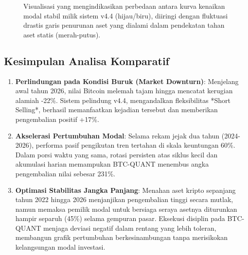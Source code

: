 \documentclass[a4paper,11pt]{article}
\begin{document}
\begin{figure}[h!]
\centering
{}
\caption{Visualisasi yang mengindikasikan perbedaan antara kurva kenaikan modal stabil milik sistem v4.4 (hijau/biru), diiringi dengan fluktuasi drastis garis penurunan aset yang dialami dalam pendekatan tahan aset statis (merah-putus).}
\end{figure}

\subsection{Kesimpulan Analisa Komparatif}
\begin{enumerate}
    \item \textbf{Perlindungan pada Kondisi Buruk (Market Downturn)}: Menjelang awal tahun 2026, nilai Bitcoin melemah tajam hingga mencatat kerugian alamiah -22\%. Sistem pelindung v4.4, mengandalkan fleksibilitas *Short Selling*, berhasil memanfaatkan kejadian tersebut dan memberikan pengembalian positif +17\%.
    \item \textbf{Akselerasi Pertumbuhan Modal}: Selama rekam jejak dua tahun (2024-2026), performa pasif pengikutan tren tertahan di skala keuntungan 60\%. Dalam porsi waktu yang sama, rotasi persisten atas siklus kecil dan akumulasi harian memampukan BTC-QUANT menembus angka pengembalian nilai sebesar 231\%.
    \item \textbf{Optimasi Stabilitas Jangka Panjang}: Menahan aset kripto sepanjang tahun 2022 hingga 2026 menjanjikan pengembalian tinggi secara mutlak, namun memaksa pemilik modal untuk bersiaga seraya asetnya diturunkan hampir separuh (45\%) selama gempuran pasar. Eksekusi disiplin pada BTC-QUANT menjaga deviasi negatif dalam rentang yang lebih toleran, membangun grafik pertumbuhan berkesinambungan tanpa merisikokan kelangsungan modal investasi.
\end{enumerate}
\end{document}
